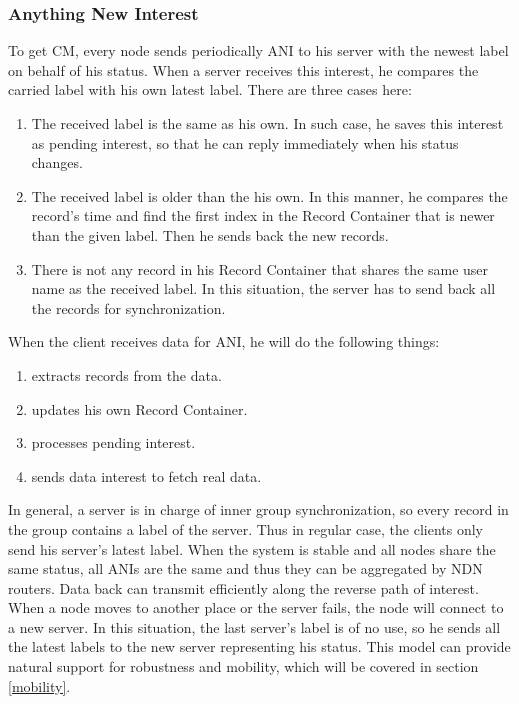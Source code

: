 \documentclass[conference]{IEEEtran}
\begin{document}
\subsubsection{Anything New Interest}
To get CM,
every node sends periodically ANI to his server with the newest label on behalf of his status.
When a server receives this interest,
he compares the carried label with his own latest label. There are three cases here:
\begin{enumerate}{}
	\item The received label is the same as his own.
In such case, he saves this interest as pending interest,
so that he can reply immediately when his status changes.
	\item The received label is older than the his own.
In this manner, he compares the record's time and find the first index
in the Record Container that is newer than the given label.
Then he sends back the new records.
	\item There is not any record in his Record Container
that shares the same user name as the received label.
In this situation, the server has to send back all the records for synchronization.
\end{enumerate}
When the client receives data for ANI, he will do the following things:
\begin{enumerate}{}
	\item extracts records from the data.
	\item updates his own Record Container.
	\item processes pending interest.
	\item sends data interest to fetch real data.
\end{enumerate}

In general, a server is in charge of inner group synchronization,
so every record in the group contains a label of the server.
Thus in regular case, the clients only send his server's latest label.
When the system is stable and all nodes share the same status,
all ANIs are the same and thus they can be aggregated by NDN routers.
Data back can transmit efficiently along the reverse path of interest.
When a node moves to another place or the server fails, the node will connect to a new server.
In this situation, the last server's label is of no use,
so he sends all the latest labels to the new server representing his status.
This model can provide natural support for robustness and mobility,
which will be covered in section \ref{mobility}.
\end{document}
